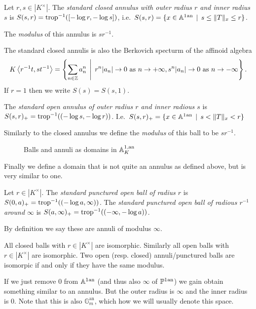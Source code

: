 \begin{definition}
	Let $r, s \in |K^{\times }|$. 
	The \emph{standard closed annulus with outer radius  $r$ and inner radius  $s$}  is $S(s, r) = \operatorname{trop}^{-1}([-\log r, -\log s])$, i.e.\ $S(s, r) = \{x \in \aff^{1}\an \st s \le \|T\|_x \le r\} $.

	The \emph{modulus} of this annulus is $s r^{-1}$. 
\end{definition}
The standard closed annulis is also the Berkovich specturm of the affinoid algebra \[
	K\left<r^{-1}t, st^{-1} \right> = \left\{\sum_{n \in \Z}^{} a_n ^{n} \st r^{n}|a_n| \to 0 \text{ as } n \to +\infty, s^n |a_n| \to 0 \text{ as } n \to - \infty\right\} 
.\] 
If $r = 1$ then we write $S(s) = S(s,1)$. 
\begin{definition}
	The \emph{standard open annulus of outer radius $r$ and inner radious $s$} is $S(s,r)_+ = \operatorname{trop}^{-1}((-\log s, -\log r))$. 
	I.e.\ $S(s,r)_+ = \{x \in \aff^{1}\an \st s < \|T\|_x < r\} $

	Similarly to the closed annulus we define the \emph{modulus} of this ball to be $s r^{-1}$. 
\end{definition}

\begin{figure}[ht]
    \centering
    \caption{Balls and annuli as domains in $\mathbb{A}^{1, \text{an}}_K$}
    \label{fig:affine-line-ball-annuli}
\end{figure}

Finally we define a domain that is not quite an annulus as defined above, but is very similar to one. 
\begin{definition}
	Let $r \in |K^{\times }|$. The \emph{standard punctured open ball of radius $r$ } is $S(0, a)_+ = \operatorname{trop}^{-1}((-\log a, \infty))$. 
	The \emph{standard punctured open ball of radious $r^{-1}$ around $\infty$} is $S(a, \infty)_+ = \operatorname{trop}^{-1}((-\infty, -\log a))$. 

	By definition we say these are annuli of modulus $\infty$. 
\end{definition}

All closed balls with $r \in |K^{\times }|$ are isomorphic. Similarly all open balls with $r \in |K^{\times }|$ are isomorphic. 
Two open (resp. closed) annuli/punctured balls are isomorpic if and only if they have the same modulus. 

\begin{remark}
	If we just remove $0$ from $\mathbb{A}^{1}{}^{\text{an}}$ (and thus also $\infty$ of $\mathbb{P}^{1}{}^{\text{an}}$) we gain obtain something similar to an annulus. But the outer radius is $\infty$ and the inner radius is $0$. 
	Note that this is also $\mathbb G^{\mathrm{an}}_m$, which how we will usually denote this space. 
\end{remark}


